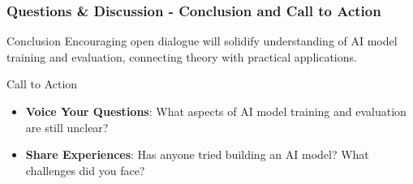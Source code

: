 \documentclass[aspectratio=169]{beamer}
\begin{document}
\begin{frame}[fragile]
    \frametitle{Questions \& Discussion - Conclusion and Call to Action}
    \begin{block}{Conclusion}
        Encouraging open dialogue will solidify understanding of AI model training and evaluation, connecting theory with practical applications.
    \end{block}
    
    \begin{block}{Call to Action}
        \begin{itemize}
            \item \textbf{Voice Your Questions}: What aspects of AI model training and evaluation are still unclear?
            \item \textbf{Share Experiences}: Has anyone tried building an AI model? What challenges did you face?
        \end{itemize}
    \end{block}
\end{frame}
\end{document}

